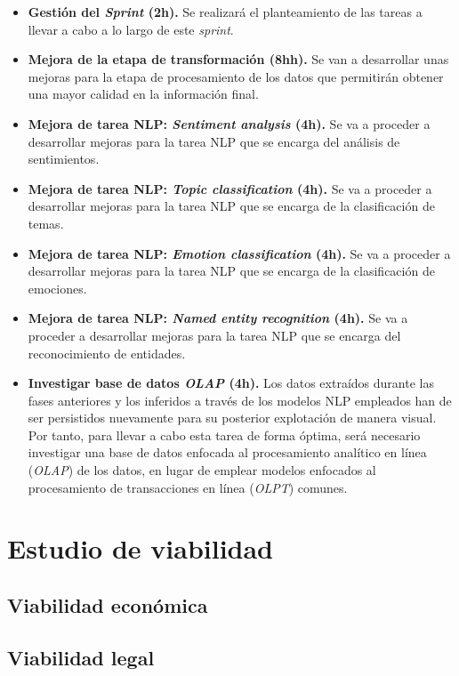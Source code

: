 \begin{itemize}

    \item \textbf{Gestión del \textit{Sprint} (2h).} Se realizará el planteamiento de las tareas a llevar a cabo a lo largo de este \textit{sprint}.

    \item \textbf{Mejora de la etapa de transformación (8hh).} Se van a desarrollar unas mejoras para la etapa de procesamiento de los datos que permitirán obtener una mayor calidad en la información final.

    \item \textbf{Mejora de tarea NLP: \textit{Sentiment analysis} (4h).} Se va a proceder a desarrollar mejoras para la tarea NLP que se encarga del análisis de sentimientos.

    \item \textbf{Mejora de tarea NLP: \textit{Topic classification} (4h).} Se va a proceder a desarrollar mejoras para la tarea NLP que se encarga de la clasificación de temas.

    \item \textbf{Mejora de tarea NLP: \textit{Emotion classification} (4h).} Se va a proceder a desarrollar mejoras para la tarea NLP que se encarga de la clasificación de emociones.

    \item \textbf{Mejora de tarea NLP: \textit{Named entity recognition} (4h).} Se va a proceder a desarrollar mejoras para la tarea NLP que se encarga del reconocimiento de entidades.

    \item \textbf{Investigar base de datos \textit{OLAP} (4h).} Los datos extraídos durante las fases anteriores y los inferidos a través de los modelos NLP empleados han de ser persistidos nuevamente para su posterior explotación de manera visual. Por tanto, para llevar a cabo esta tarea de forma óptima, será necesario investigar una base de datos enfocada al procesamiento analítico en línea (\textit{OLAP}) de los datos, en lugar de emplear modelos enfocados al procesamiento de transacciones en línea (\textit{OLPT}) comunes.

\end{itemize}

\section{Estudio de viabilidad}

\subsection{Viabilidad económica}

\subsection{Viabilidad legal}


